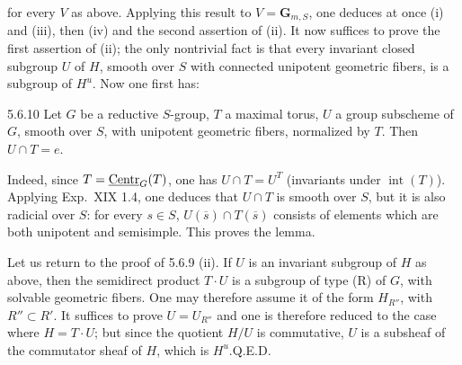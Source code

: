 for every $V$ as above. Applying this result to $V=\mathbf G_{m,S}$, one deduces at once (i) and (iii), then (iv) and the second assertion of (ii). It now suffices to prove the first assertion of (ii); the only nontrivial fact is that every invariant closed subgroup $U$ of $H$, smooth over $S$ with connected unipotent geometric fibers, is a subgroup of $H^u$. Now one first has:
\begin{lemma}{5.6.10}\label{XXII.5.6.10}
Let $G$ be a reductive $S$-group, $T$ a maximal torus, $U$ a group subscheme of $G$, smooth over $S$, with unipotent geometric fibers, normalized by $T$. Then $U\cap T=e$.
\end{lemma}
Indeed, since $T=\underline{\mathrm{Centr}}_G(T)$, one has $U\cap T=U^T$ (invariants under $\operatorname{int}(T)$). Applying Exp.~XIX 1.4, one deduces that $U\cap T$ is smooth over $S$, but it is also radicial over $S$: for every $s\in S$, $U(\overline s)\cap T(\overline s)$ consists of elements which are both unipotent and semisimple. This proves the lemma.

Let us return to the proof of 5.6.9 (ii). If $U$ is an invariant subgroup of $H$ as above, then the semidirect product $T\cdot U$ is a subgroup of type (R) of $G$, with solvable geometric fibers. One may therefore assume it of the form $H_{R''}$, with $R''\subset R'$. It suffices to prove $U=U_{R''}$ and one is therefore reduced to the case where $H=T\cdot U$; but since the quotient $H/U$ is commutative, $U$ is a subsheaf of the commutator sheaf of $H$, which is $H^u$.\hfill Q.E.D.

